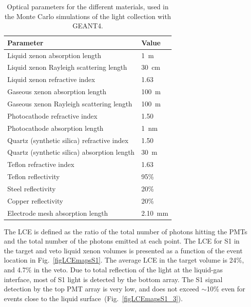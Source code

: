 \begin{table}[!h]
\centering
\caption{Optical parameters for the different materials, used in the Monte Carlo simulations of the light collection with GEANT4.}
\label{tabOpticalParameters}
\begin{tabular}{>{\footnotesize}l |>{\footnotesize} l}
\hline
Parameter						& Value \\
\hline
Liquid xenon absorption length 			& 1~m \\
Liquid xenon Rayleigh scattering length		& 30~cm \\
Liquid xenon refractive index				& 1.63 \\
Gaseous xenon absorption length 			& 100~m \\
Gaseous xenon Rayleigh scattering length 	& 100~m \\
Photocathode refractive index 				& 1.50 \\
Photocathode absorption length 			& 1~nm \\
Quartz (synthetic silica) refractive index 		& 1.50 \\
Quartz (synthetic silica) absorption length 	& 30~m \\
Teflon refractive index 					& 1.63 \\
Teflon reflectivity 						& 95\% \\
Steel reflectivity 						& 20\% \\
Copper reflectivity						& 20\% \\
Electrode mesh absorption length			& 2.10~mm \\
\hline
\end{tabular}
\end{table}


The LCE is defined as the ratio of the total number of photons hitting the PMTs and the total number of the photons emitted at each point. The LCE for S1 in the target and veto liquid xenon volumes is presented as a function of the event location in Fig.~\ref{figLCEmapsS1}. The average LCE in the target volume is 24\%, and 4.7\% in the veto. Due to total reflection of the light at the liquid-gas interface, most of S1 light is detected by the bottom array. The S1 signal detection by the top PMT array is very low, and does not exceed $\sim$10\% even for events close to the liquid surface~(Fig.~\ref{figLCEmapsS1_3}). 

